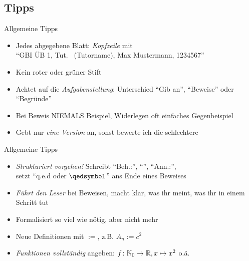 \subsection{Tipps}
\begin{frame}{Allgemeine Tipps}
    \begin{itemize}[<+->]
    	\item Jedes abgegebene Blatt: \emph{Kopfzeile} mit \\{\centering``GBI ÜB 1, \quad Tut. \hashtag\mytutnumber\ (Tutorname), \quad Max Mustermann, 1234567''}
        \item Kein roter oder grüner Stift
		\item Achtet auf die \emph{Aufgabenstellung}: Unterschied  ``Gib an'', ``Beweise'' oder ``Begründe''
		\item Bei Beweis \alert{NIEMALS} Beispiel, Widerlegen oft einfaches Gegenbeispiel
		\item Gebt nur \emph{eine Version} an, sonst bewerte ich die schlechtere
    	\end{itemize}
\end{frame}

\begin{frame}{Allgemeine Tipps}
    \begin{itemize}[<+->]
    	\item \emph{Strukturiert vorgehen!} Schreibt ``Beh.:'', ``\zz'', ``Ann.:'',\\
    	setzt ``q.e.d oder $\qedsymbol$'' ans Ende eines Beweises
    	\item \emph{Führt den Leser} bei Beweisen, macht klar, was ihr meint, was ihr in einem Schritt tut
    	\item Formalisiert so viel wie nötig, aber nicht mehr
    	\item Neue Definitionen mit \emph{$:=$}, z.B. $A_n := c^2$
    	\item \emph{Funktionen vollständig} angeben: $f \colon \mathbb{N}_0 \to \mathbb{R}, x \mapsto x^2$ o.ä.
    \end{itemize}
\end{frame}